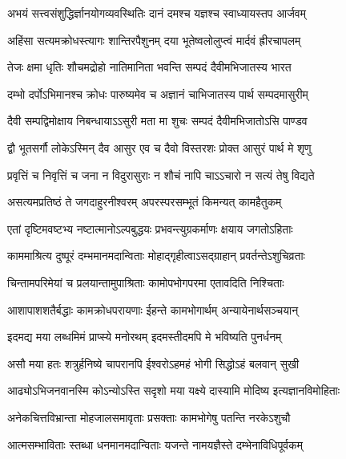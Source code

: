 \twolineshloka
{अभयं सत्त्वसंशुद्धिर्ज्ञानयोगव्यवस्थितिः}
{दानं दमश्च यज्ञश्च स्वाध्यायस्तप आर्जवम्}%

\twolineshloka
{अहिंसा सत्यमक्रोधस्त्यागः शान्तिरपैशुनम्}
{दया भूतेष्वलोलुप्त्वं मार्दवं ह्रीरचापलम्}%

\twolineshloka
{तेजः क्षमा धृतिः शौचमद्रोहो नातिमानिता}
{भवन्ति सम्पदं दैवीमभिजातस्य भारत}%

\twolineshloka
{दम्भो दर्पोऽभिमानश्च क्रोधः पारुष्यमेव च}
{अज्ञानं चाभिजातस्य पार्थ सम्पदमासुरीम्}%

\twolineshloka
{दैवी सम्पद्विमोक्षाय निबन्धायाऽऽसुरी मता}
{मा शुचः सम्पदं दैवीमभिजातोऽसि पाण्डव}%

\twolineshloka
{द्वौ भूतसर्गौ लोकेऽस्मिन् दैव आसुर एव च}
{दैवो विस्तरशः प्रोक्त आसुरं पार्थ मे शृणु}%

\twolineshloka
{प्रवृत्तिं च निवृत्तिं च जना न विदुरासुराः}
{न शौचं नापि चाऽऽचारो न सत्यं तेषु विद्यते}%

\twolineshloka
{असत्यमप्रतिष्ठं ते जगदाहुरनीश्वरम्}
{अपरस्परसम्भूतं किमन्यत् कामहैतुकम्}%

\twolineshloka
{एतां दृष्टिमवष्टभ्य नष्टात्मानोऽल्पबुद्धयः}
{प्रभवन्त्युग्रकर्माणः क्षयाय जगतोऽहिताः}%

\twolineshloka
{काममाश्रित्य दुष्पूरं दम्भमानमदान्विताः}
{मोहाद्गृहीत्वाऽसद्ग्राहान् प्रवर्तन्तेऽशुचिव्रताः}%

\twolineshloka
{चिन्तामपरिमेयां च प्रलयान्तामुपाश्रिताः}
{कामोपभोगपरमा एतावदिति निश्चिताः}%

\twolineshloka
{आशापाशशतैर्बद्धाः कामक्रोधपरायणाः}
{ईहन्ते कामभोगार्थम् अन्यायेनार्थसञ्चयान्}%

\twolineshloka
{इदमद्य मया लब्धमिमं प्राप्स्ये मनोरथम्}
{इदमस्तीदमपि मे भविष्यति पुनर्धनम्}%

\twolineshloka
{असौ मया हतः शत्रुर्हनिष्ये चापरानपि}
{ईश्वरोऽहमहं भोगी सिद्धोऽहं बलवान् सुखी}%

\twolineshloka
{आढ्योऽभिजनवानस्मि कोऽन्योऽस्ति सदृशो मया}
{यक्ष्ये दास्यामि मोदिष्य इत्यज्ञानविमोहिताः}%

\twolineshloka
{अनेकचित्तविभ्रान्ता मोहजालसमावृताः}
{प्रसक्ताः कामभोगेषु पतन्ति नरकेऽशुचौ}%

\twolineshloka
{आत्मसम्भाविताः स्तब्धा धनमानमदान्विताः}
{यजन्ते नामयज्ञैस्ते दम्भेनाविधिपूर्वकम्}%

